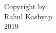 


\begin{center}
\null
\vfill
\begin{doublespace}
Copyright by \\ 
Rahul Kashyap \\ 
2019 \\
\end{doublespace}
\end{center}
